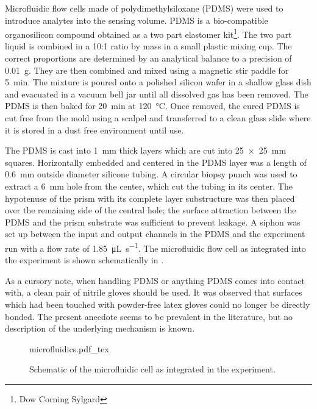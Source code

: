 Microfluidic flow cells made of polydimethylsiloxane (PDMS) were used to
introduce analytes into the sensing volume.  PDMS is a bio-compatible
organosilicon compound obtained as a two part elastomer kit\footnote{Dow
Corning Sylgard}.  The two part liquid is combined in a
10:1 ratio by mass in a small plastic mixing cup.  The correct proportions
are determined by an analytical balance to a precision of \SI{0.01}{\gram}.
They are then combined and mixed using a magnetic stir paddle for
\SI{5}{\minute}.  The mixture is poured onto a polished silicon wafer in a
shallow glass dish and evacuated in a vacuum bell jar until all dissolved
gas has been removed.  The PDMS is then baked for \SI{20}{\minute} at
\SI{120}{\celsius}.  Once removed, the cured PDMS is cut free from the mold
using a scalpel and transferred to a clean glass slide where it is stored
in a dust free environment until use.

The PDMS is cast into \SI{1}{\milli\meter} thick layers which are cut into
\SI{25x25}{\milli\meter} squares.  Horizontally embedded and centered in the
PDMS layer was a length of \SI{0.6}{\milli\meter} outside diameter
silicone tubing.  A circular biopsy punch was used to extract a
\SI{6}{\milli\meter} hole from the center, which cut the tubing in its center.
The hypotenuse of the prism with its complete layer substructure was then
placed over the remaining side of the central hole; the surface attraction
between the PDMS and the prism substrate was sufficient to prevent leakage.  A
siphon was set up between the input and output channels in the PDMS and the
experiment run with a flow rate of \SI{1.85}{\micro\liter\per\second}.  The
microfluidic flow cell as integrated into the experiment is shown schematically
in .

As a cursory note, when handling PDMS or anything PDMS comes into contact
with, a clean pair of nitrile gloves should be used.  It was observed that
surfaces which had been touched with powder-free latex gloves could no
longer be directly bonded.  The present anecdote seems to be prevalent in
the literature, but no description of the underlying mechanism is known.

\begin{figure}[ht]
\centering
{microfluidics.pdf_tex}
\caption{Schematic of the microfluidic cell as integrated in the experiment.}
\label{fig:microfluidiccell}
\end{figure}
